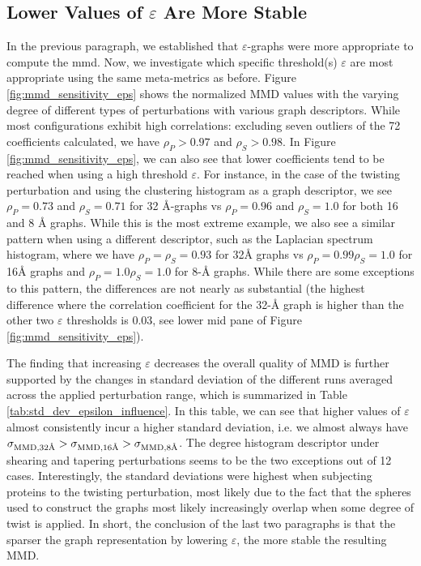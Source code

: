 \subsection{Lower Values of $\varepsilon$ Are More Stable}
\label{sec:sparser_better}
In the previous paragraph, we established that $\varepsilon$-graphs were more
appropriate to compute the \acrshort{mmd}. Now, we investigate which specific
threshold(s) $\varepsilon$ are most appropriate using the same meta-metrics as
before. Figure \ref{fig:mmd_sensitivity_eps} shows the normalized MMD values
with the varying degree of different types of perturbations with various graph
descriptors. While most configurations exhibit high correlations: excluding
seven outliers of the 72 coefficients calculated, we have $\rho_P>0.97$ and
$\rho_S>0.98$. In Figure \ref{fig:mmd_sensitivity_eps}, we can also see that
lower coefficients tend to be reached when using a high threshold $\varepsilon$.
For instance, in the case of the twisting perturbation and using the clustering
histogram as a graph descriptor, we see $\rho_P=0.73$ and $\rho_S=0.71$ for 32
\si{\angstrom}-graphs vs $\rho_P=0.96$ and $\rho_S=1.0$ for both 16 and 8
\si{\angstrom} graphs. While this is the most extreme example, we also see a
similar pattern when using a different descriptor, such as the Laplacian
spectrum histogram, where we have $\rho_P=\rho_S=0.93$ for 32\si{\angstrom}
graphs vs $\rho_P=0.99 \rho_S=1.0$ for 16\si{\angstrom} graphs and $\rho_P=1.0
\rho_S=1.0$ for 8-\si{\angstrom} graphs. While there are some exceptions to this
pattern, the differences are not nearly as substantial (the highest difference
where the correlation coefficient for the 32-\si{\angstrom} graph is higher than
the other two $\varepsilon$ thresholds is 0.03, see lower mid pane of Figure
\ref{fig:mmd_sensitivity_eps}).

The finding that increasing $\varepsilon$ decreases the overall quality of MMD
is further supported by the changes in standard deviation of the different runs
averaged across the applied perturbation range, which is summarized in Table
\ref{tab:std_dev_epsilon_influence}. In this table, we can see that higher
values of $\varepsilon$ almost consistently incur a higher standard deviation,
i.e. we almost always have $\sigma_{\text{MMD}, 32\si{\angstrom}}>\sigma_{\text{MMD},
  16\si{\angstrom}}>\sigma_{\text{MMD}, 8\si{\angstrom}}$. The degree histogram descriptor under shearing
and tapering perturbations seems to be the two exceptions out of 12 cases.
Interestingly, the standard deviations were highest when subjecting proteins to
the twisting perturbation, most likely due to the fact that the spheres used to
construct the graphs most likely increasingly overlap when some degree of twist
is applied. In short, the conclusion of the last two paragraphs is that the
sparser the graph representation by lowering $\varepsilon$, the more stable the
resulting MMD.

